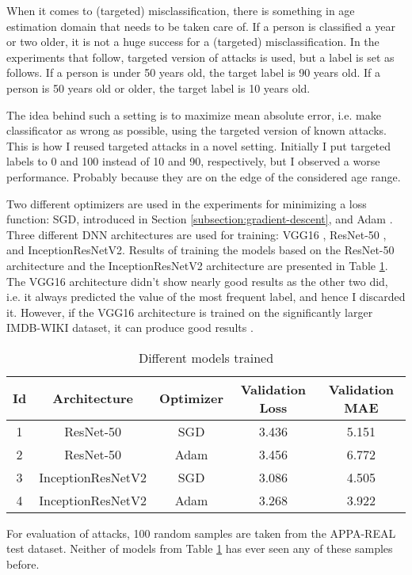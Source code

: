 When it comes to (targeted) misclassification, there is something in age estimation domain that needs to be taken care of. If a person is classified a year or two older, it is not a huge success for a (targeted) misclassification. In the experiments that follow, targeted version of attacks is used, but a label is set as follows. If a person is under 50 years old, the target label is 90 years old. If a person is 50 years old or older, the target label is 10 years old. 

The idea behind such a setting is to maximize mean absolute error, i.e. make classificator as wrong as possible, using the targeted version of known attacks.  This is how I reused targeted attacks in a novel setting. Initially I put targeted labels to 0 and 100 instead of 10 and 90, respectively, but I observed a worse performance. Probably because they are on the edge of the considered age range.

Two different optimizers are used in the experiments for minimizing a loss function: SGD, introduced in Section \ref{subsection:gradient-descent}, and Adam \cite{DBLP:journals/corr/KingmaB14}. Three different DNN architectures are used for training: VGG16 \cite{DBLP:journals/corr/SimonyanZ14a}, ResNet-50 \cite{DBLP:journals/corr/HeZRS15}, and InceptionResNetV2\cite{DBLP:journals/corr/SzegedyIV16}. Results of training the models based on the ResNet-50 architecture and the InceptionResNetV2 architecture are presented in Table \ref{table:trained-models}. The VGG16 architecture didn't show nearly good results as the other two did, i.e. it always predicted the value of the most frequent label, and hence I discarded it. However, if the VGG16 architecture is trained on the significantly larger IMDB-WIKI dataset, it can produce good results \cite{Rothe-IJCV-2016}. 

\begin{table}[]
\centering
\begin{tabular}{|c|c|c|c|c|}
\hline
Id & Architecture & Optimizer & Validation Loss & \textbf{Validation MAE} \\ \hline
1 & ResNet-50 & SGD & 3.436 & 5.151 \\ \hline
2 & ResNet-50 & Adam & 3.456 & 6.772 \\ \hline
3 & InceptionResNetV2 & SGD & 3.086 & 4.505  \\ \hline
4 & InceptionResNetV2 & Adam & 3.268 & 3.922 \\ \hline
\end{tabular}
\caption{Different models trained}
\label{table:trained-models}
\end{table}

For evaluation of attacks, 100 random samples are taken from the APPA-REAL test dataset. Neither of models from Table \ref{table:trained-models} has ever seen any of these samples before.
